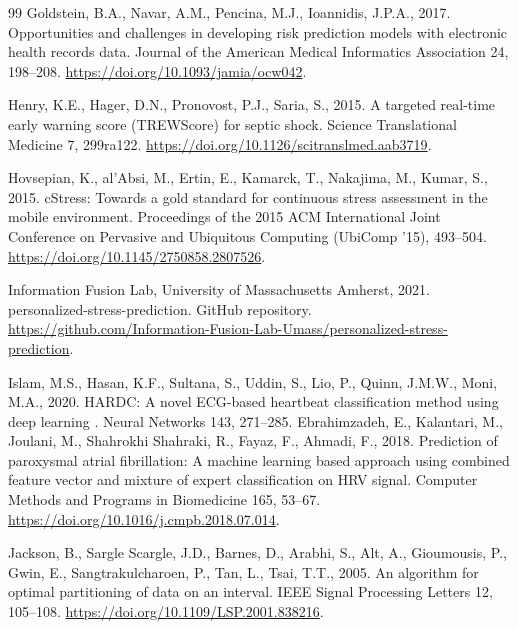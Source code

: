 \documentclass[preprint,12pt,authoryear]{elsarticle}
\providecommand{\DIFaddtex}[1]{{\protect\color{blue} \sf #1}} %
\providecommand{\DIFdeltex}[1]{{\protect\color{red} \scriptsize #1}} %
\providecommand{\DIFaddbegin}{} %
\providecommand{\DIFaddend}{} %
\providecommand{\DIFdelbegin}{} %
\providecommand{\DIFdelend}{} %
\providecommand{\DIFadd}[1]{\texorpdfstring{\DIFaddtex{#1}}{#1}} %
\providecommand{\DIFdel}[1]{\texorpdfstring{\DIFdeltex{#1}}{}} %
\newcommand{\DIFscaledelfig}{0.5}
\newlength{\DIFdelgraphicswidth} %
\newlength{\DIFdelgraphicsheight} %
\newcommand{\DIFaddincludegraphics}[2][]{{\color{blue}\fbox{\DIFOincludegraphics[#1]{#2}}}} %
\newcommand{\DIFdelincludegraphics}[2][]{%
\sbox{\DIFdelgraphicsbox}{\DIFOincludegraphics[#1]{#2}}%
\settoboxwidth{\DIFdelgraphicswidth}{\DIFdelgraphicsbox} %
\settoboxtotalheight{\DIFdelgraphicsheight}{\DIFdelgraphicsbox} %
\scalebox{\DIFscaledelfig}{%
\parbox[b]{\DIFdelgraphicswidth}{\usebox{\DIFdelgraphicsbox}\\[-\baselineskip] \rule{\DIFdelgraphicswidth}{0em}}\llap{\resizebox{\DIFdelgraphicswidth}{\DIFdelgraphicsheight}{%
\setlength{\unitlength}{\DIFdelgraphicswidth}%
\begin{picture}(1,1)%
\thicklines\linethickness{2pt} %
{\color[rgb]{1,0,0}\put(0,0){\framebox(1,1){}}}%
{\color[rgb]{1,0,0}\put(0,0){\line( 1,1){1}}}%
{\color[rgb]{1,0,0}\put(0,1){\line(1,-1){1}}}%
\end{picture}%
}\hspace*{3pt}}} %
} %
\DeclareRobustCommand{\DIFaddbegin}{\DIFOaddbegin \let\includegraphics\DIFaddincludegraphics} %
\DeclareRobustCommand{\DIFaddend}{\DIFOaddend \let\includegraphics\DIFOincludegraphics} %
\DeclareRobustCommand{\DIFdelbegin}{\DIFOdelbegin \let\includegraphics\DIFdelincludegraphics} %
\DeclareRobustCommand{\DIFdelend}{\DIFOaddend \let\includegraphics\DIFOincludegraphics} %
\begin{document}
\begin{thebibliography}{99}
Goldstein, B.A., Navar, A.M., Pencina, M.J., Ioannidis, J.P.A., 2017.
Opportunities and challenges in developing risk prediction models with
electronic health records data.
Journal of the American Medical Informatics Association 24, 198--208.
\url{https://doi.org/10.1093/jamia/ocw042}.

Henry, K.E., Hager, D.N., Pronovost, P.J., Saria, S., 2015.
A targeted real-time early warning score (TREWScore) for septic shock.
Science Translational Medicine 7, 299ra122.
\url{https://doi.org/10.1126/scitranslmed.aab3719}.

Hovsepian, K., al'Absi, M., Ertin, E., Kamarck, T., Nakajima, M.,
Kumar, S., 2015.
cStress: Towards a gold standard for continuous stress assessment in
the mobile environment.
Proceedings of the 2015 ACM International Joint Conference on Pervasive
and Ubiquitous Computing (UbiComp '15), 493--504.
\url{https://doi.org/10.1145/2750858.2807526}.

Information Fusion Lab, University of Massachusetts Amherst, 2021.
personalized-stress-prediction. GitHub repository.
\url{https://github.com/Information-Fusion-Lab-Umass/personalized-stress-prediction}.

\DIFdelbegin {}
\DIFdel{Islam, M.S., Hasan, K.F., Sultana, S., Uddin, S., Lio, P.,
Quinn, J.M.W., Moni, M.A., 2020.
HARDC: A novel ECG-based heartbeat classification method using deep
learning .
Neural Networks 143, 271--285.
}%
\DIFdelend \DIFaddbegin {}
\DIFadd{Ebrahimzadeh, E., Kalantari, M., Joulani, M., Shahrokhi Shahraki, R.,
Fayaz, F., Ahmadi, F., 2018.
Prediction of paroxysmal atrial fibrillation: A machine learning based
approach using combined feature vector and mixture of expert
classification on HRV signal.
Computer Methods and Programs in Biomedicine 165, 53--67.
}\url{https://doi.org/10.1016/j.cmpb.2018.07.014}\DIFaddend .

Jackson, B., \DIFdelbegin \DIFdel{Sargle}\DIFdelend \DIFaddbegin \DIFadd{Scargle}\DIFaddend , J.D., Barnes, D., Arabhi, S., Alt, A.,
Gioumousis, P., Gwin, E., Sangtrakulcharoen, P., Tan, L., Tsai, T.T.,
2005.
An algorithm for optimal partitioning of data on an interval.
IEEE Signal Processing Letters 12, 105--108.
\url{https://doi.org/10.1109/LSP.2001.838216}.


\end{thebibliography}
\end{document}
